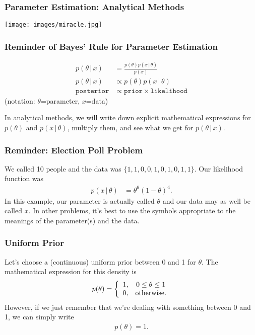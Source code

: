 \documentclass{beamer}
\newcommand{\given}{\,|\,}
\begin{document}
\begin{frame}
\frametitle{Parameter Estimation: Analytical Methods}

\begin{center}
\texttt{[image: images/miracle.jpg]}
\end{center}

\end{frame}

\begin{frame}
\frametitle{Reminder of Bayes' Rule for Parameter Estimation}

\begin{align}
p(\theta \given x) &= \frac{p(\theta)p(x \given \theta)}{p(x)} \\
p(\theta \given x) &\propto p(\theta)p(x \given \theta) \\
\texttt{posterior} &\propto \texttt{prior} \times \texttt{likelihood}
\end{align}
(notation: $\theta$=parameter, $x$=data)\pause

In analytical methods, we will write down explicit mathematical expressions
for $p(\theta)$ and $p(x \given \theta)$, multiply them, and see what we
get for $p(\theta \given x)$.

\end{frame}


\begin{frame}
\frametitle{Reminder: Election Poll Problem}
We called 10 people and the data was
$\{1, 1, 0, 0, 1, 0, 1, 0, 1, 1\}$. Our likelihood function was
\begin{align}
p(x \given \theta) &= \theta^6(1-\theta)^4.
\end{align}
\pause
In this example, our parameter is actually called $\theta$ and our data may
as well be called $x$. In other problems, it's best to use the symbols
appropriate to the meanings of the parameter(s) and the data.
\end{frame}


\begin{frame}
\frametitle{Uniform Prior}
Let's choose a (continuous) uniform prior between 0 and 1 for $\theta$.
The mathematical expression for this density is
\begin{align}
p(\theta) = \left\{
                \begin{array}{cc}
                1, & 0 \leq \theta \leq 1 \\
                0, & \textnormal{otherwise}.
                \end{array}
            \right.
\end{align}
\pause
However, if we just remember that we're dealing with something between 0 and 1,
we can simply write
\begin{align}
p(\theta) = 1.
\end{align}

\end{frame}
\end{document}
